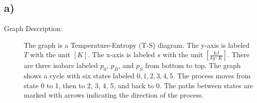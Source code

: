 

\subsection*{a)}

\begin{description}
    \item[Graph Description:] The graph is a Temperature-Entropy (T-S) diagram. The y-axis is labeled \( T \) with the unit \( [K] \). The x-axis is labeled \( s \) with the unit \( \left[ \frac{kJ}{kg \cdot K} \right] \). There are three isobars labeled \( p_0 \), \( p_B \), and \( p_S \) from bottom to top. The graph shows a cycle with six states labeled \( 0, 1, 2, 3, 4, 5 \). The process moves from state 0 to 1, then to 2, 3, 4, 5, and back to 0. The paths between states are marked with arrows indicating the direction of the process.
\end{description}